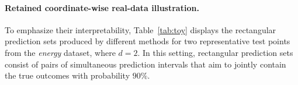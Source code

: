 \paragraph{Retained coordinate-wise real-data illustration.}
To emphasize their interpretability, Table~\ref{tab:toy} displays the rectangular prediction sets produced by different methods for two representative test points from the \emph{energy} dataset, where $d=2$. In this setting, rectangular prediction sets consist of pairs of simultaneous prediction intervals that aim to jointly contain the true outcomes with probability $90\%$.

\begin{table}[!htbp]

\caption{Anecdotal illustration of conformal prediction sets of rectangular shape for two test points from the \emph{energy} dataset. In this case, the prediction sets can be reported as pairs of joint prediction intervals for the two outcome dimensions. Volumes are computed in residual space. Intervals that fail to cover the corresponding true outcomes are highlighted in \textcolor{red}{red}; smallest interval that covers the ground truth is highlighted in \textbf{bold}. This example is included for illustration only: the coverage guarantees of conformal prediction hold on average, not for individual test points.}
\label{tab:toy}
\end{table}

\FloatBarrier
\endgroup
